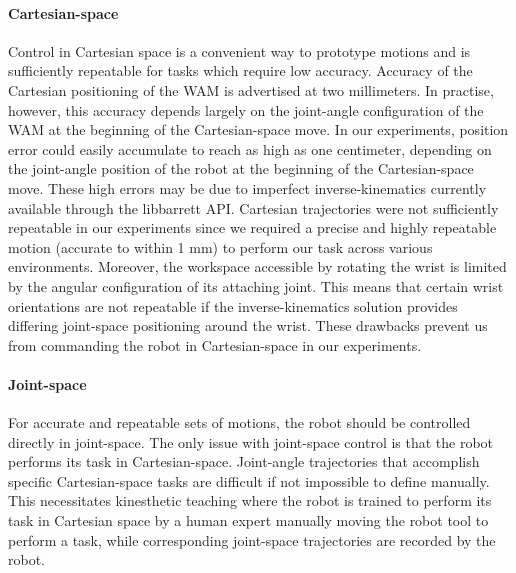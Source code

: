 \paragraph{Cartesian-space}
Control in Cartesian space is a convenient way to prototype motions and is sufficiently repeatable for tasks which require low accuracy.
Accuracy of the Cartesian positioning of the WAM is advertised at two millimeters.
In practise, however, this accuracy depends largely on the joint-angle configuration of the WAM at the beginning of the Cartesian-space move.
In our experiments, position error could easily accumulate to reach as high as one centimeter, depending on the joint-angle position of the robot at the beginning of the Cartesian-space move.
These high errors may be due to imperfect inverse-kinematics currently available through the libbarrett API.
Cartesian trajectories were not sufficiently repeatable in our experiments since we required a precise and highly repeatable motion (accurate to within 1 mm) to perform our task across various environments.
Moreover, the workspace accessible by rotating the wrist is limited by the angular configuration of its attaching joint. 
This means that certain wrist orientations are not repeatable if the inverse-kinematics solution provides differing joint-space positioning around the wrist.
These drawbacks prevent us from commanding the robot in Cartesian-space in our experiments.

\paragraph{Joint-space}
For accurate and repeatable sets of motions, the robot should be controlled directly in joint-space.
The only issue with joint-space control is that the robot performs its task in Cartesian-space. 
Joint-angle trajectories that accomplish specific Cartesian-space tasks are difficult if not impossible to define manually.
This necessitates kinesthetic teaching where the robot is trained to perform its task in Cartesian space by a human expert manually moving the robot tool to perform a task, while corresponding joint-space trajectories are recorded by the robot.

